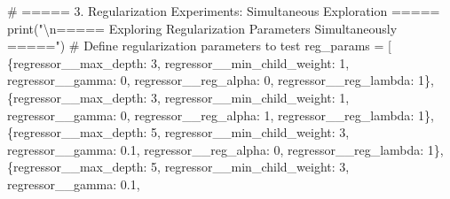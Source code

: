 \documentclass[
  letterpaper,
  DIV=11,
  numbers=noendperiod]{scrreprt}
\newenvironment{Shaded}{\begin{snugshade}}{\end{snugshade}}
\newcommand{\BuiltInTok}[1]{\textcolor[rgb]{0.00,0.23,0.31}{#1}}
\newcommand{\CharTok}[1]{\textcolor[rgb]{0.13,0.47,0.30}{#1}}
\newcommand{\CommentTok}[1]{\textcolor[rgb]{0.37,0.37,0.37}{#1}}
\newcommand{\DecValTok}[1]{\textcolor[rgb]{0.68,0.00,0.00}{#1}}
\newcommand{\FloatTok}[1]{\textcolor[rgb]{0.68,0.00,0.00}{#1}}
\newcommand{\NormalTok}[1]{\textcolor[rgb]{0.00,0.23,0.31}{#1}}
\newcommand{\OperatorTok}[1]{\textcolor[rgb]{0.37,0.37,0.37}{#1}}
\newcommand{\StringTok}[1]{\textcolor[rgb]{0.13,0.47,0.30}{#1}}
\begin{document}
\begin{Shaded}
\begin{Highlighting}[]

\CommentTok{\# ===== 3. Regularization Experiments: Simultaneous Exploration  =====}
\BuiltInTok{print}\NormalTok{(}\StringTok{"}\CharTok{\textbackslash{}n}\StringTok{===== Exploring Regularization Parameters Simultaneously ====="}\NormalTok{)}
\CommentTok{\# Define regularization parameters to test}
\NormalTok{reg\_params }\OperatorTok{=}\NormalTok{ [}
\NormalTok{    \{}\StringTok{\textquotesingle{}regressor\_\_max\_depth\textquotesingle{}}\NormalTok{: }\DecValTok{3}\NormalTok{, }\StringTok{\textquotesingle{}regressor\_\_min\_child\_weight\textquotesingle{}}\NormalTok{: }\DecValTok{1}\NormalTok{, }\StringTok{\textquotesingle{}regressor\_\_gamma\textquotesingle{}}\NormalTok{: }\DecValTok{0}\NormalTok{, }
     \StringTok{\textquotesingle{}regressor\_\_reg\_alpha\textquotesingle{}}\NormalTok{: }\DecValTok{0}\NormalTok{, }\StringTok{\textquotesingle{}regressor\_\_reg\_lambda\textquotesingle{}}\NormalTok{: }\DecValTok{1}\NormalTok{\},}
\NormalTok{    \{}\StringTok{\textquotesingle{}regressor\_\_max\_depth\textquotesingle{}}\NormalTok{: }\DecValTok{3}\NormalTok{, }\StringTok{\textquotesingle{}regressor\_\_min\_child\_weight\textquotesingle{}}\NormalTok{: }\DecValTok{1}\NormalTok{, }\StringTok{\textquotesingle{}regressor\_\_gamma\textquotesingle{}}\NormalTok{: }\DecValTok{0}\NormalTok{, }
     \StringTok{\textquotesingle{}regressor\_\_reg\_alpha\textquotesingle{}}\NormalTok{: }\DecValTok{1}\NormalTok{, }\StringTok{\textquotesingle{}regressor\_\_reg\_lambda\textquotesingle{}}\NormalTok{: }\DecValTok{1}\NormalTok{\},}
\NormalTok{    \{}\StringTok{\textquotesingle{}regressor\_\_max\_depth\textquotesingle{}}\NormalTok{: }\DecValTok{5}\NormalTok{, }\StringTok{\textquotesingle{}regressor\_\_min\_child\_weight\textquotesingle{}}\NormalTok{: }\DecValTok{3}\NormalTok{, }\StringTok{\textquotesingle{}regressor\_\_gamma\textquotesingle{}}\NormalTok{: }\FloatTok{0.1}\NormalTok{, }
     \StringTok{\textquotesingle{}regressor\_\_reg\_alpha\textquotesingle{}}\NormalTok{: }\DecValTok{0}\NormalTok{, }\StringTok{\textquotesingle{}regressor\_\_reg\_lambda\textquotesingle{}}\NormalTok{: }\DecValTok{1}\NormalTok{\},}
\NormalTok{    \{}\StringTok{\textquotesingle{}regressor\_\_max\_depth\textquotesingle{}}\NormalTok{: }\DecValTok{5}\NormalTok{, }\StringTok{\textquotesingle{}regressor\_\_min\_child\_weight\textquotesingle{}}\NormalTok{: }\DecValTok{3}\NormalTok{, }\StringTok{\textquotesingle{}regressor\_\_gamma\textquotesingle{}}\NormalTok{: }\FloatTok{0.1}\NormalTok{, }

\end{Highlighting}
\end{Shaded}
\end{document}
